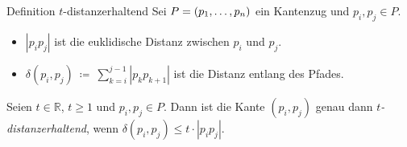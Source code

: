 \documentclass{beamer}
\begin{document}
	\begin{frame}{Definition $t$-distanzerhaltend}
		Sei $P = (p_1, \mathellipsis, p_n)$ ein Kantenzug und $p_i, p_j \in P$.
		\begin{itemize}
			\item<1-> $|p_ip_j|$ ist die euklidische Distanz zwischen $p_i$ und $p_j$.
			\item<2->$\delta(p_i, p_j)~\coloneqq~\sum\limits_{k=i}^{j-1}{|p_kp_{k+1}|}$ ist die Distanz entlang des Pfades.
		\end{itemize}
		\begin{definition}
			Seien $t \in \mathbb{R}$, $t \geq 1$ und $p_i, p_j \in P$. 
			Dann ist die Kante $(p_i, p_j)$ genau dann \emph{$t$-distanzerhaltend}, wenn $\delta(p_i, p_j) \leq t \cdot |p_ip_j|$.
		\end{definition}
		
	\end{frame}
	
\end{document}
